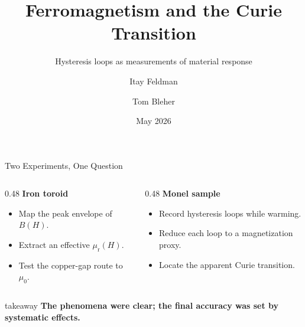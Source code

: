 \documentclass[aspectratio=169]{beamer}
\title[Ferromagnetism Lab]{Ferromagnetism and the Curie Transition}
\subtitle{Hysteresis loops as measurements of material response}
\author[I. Feldman, T. Bleher]{Itay Feldman \and Tom Bleher}
\institute[Tel Aviv University]{School of Physics and Astronomy\\Tel Aviv University}
\date{May 2026}
\newcommand{\mur}{\mu_{\mathrm r}}
\newcommand{\takeaway}[1]{%
  \vspace{0.1em}
  \begin{center}
    \begin{beamercolorbox}[wd=0.94\textwidth,sep=0.35em,center,rounded=true]{takeaway}
      \textbf{#1}
    \end{beamercolorbox}
  \end{center}
}
\begin{document}
\begin{frame}
  \titlepage
\end{frame}

\begin{frame}{Two Experiments, One Question}
  \large
  \begin{columns}[T,onlytextwidth]
    \begin{column}{0.48\textwidth}
      \textbf{Iron toroid}
      \vspace{0.5em}
      \begin{itemize}
        \item Map the peak envelope of $B(H)$.
        \item Extract an effective $\mur(H)$.
        \item Test the copper-gap route to $\mu_0$.
      \end{itemize}
    \end{column}
    \begin{column}{0.48\textwidth}
      \textbf{Monel sample}
      \vspace{0.5em}
      \begin{itemize}
        \item Record hysteresis loops while warming.
        \item Reduce each loop to a magnetization proxy.
        \item Locate the apparent Curie transition.
      \end{itemize}
    \end{column}
  \end{columns}
  \takeaway{The phenomena were clear; the final accuracy was set by systematic effects.}
\end{frame}
\end{document}
